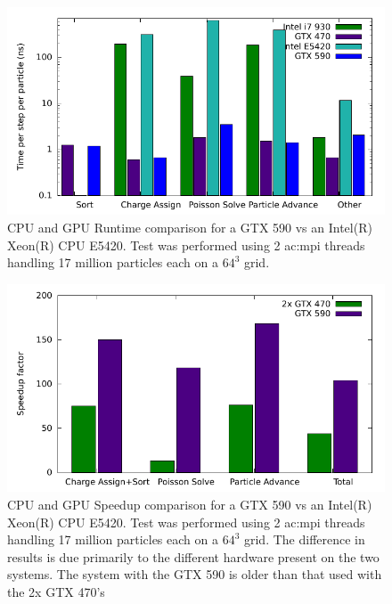 \noindent \begin{figure}
\begin{center}
\includegraphics[width=6in]{performance/architecture_compare.pdf}
\end{center}
\caption[CPU and GPU Runtime comparison]{CPU and GPU Runtime comparison for a GTX 590 vs an Intel(R) Xeon(R) CPU E5420. Test was performed using 2 \gls{ac:mpi} threads handling 17 million particles each on a $64^3$ grid.}
\label{fig:speedup} 
\end{figure} 

\noindent \begin{figure}
\begin{center}
\includegraphics[width=6in]{performance/architecture_speedup_compare.pdf}
\end{center}
\caption[CPU and GPU Speedup comparison]{CPU and GPU Speedup comparison for a GTX 590 vs an Intel(R) Xeon(R) CPU E5420. Test was performed using 2 \gls{ac:mpi} threads handling 17 million particles each on a $64^3$ grid. The difference in results is due primarily to the different hardware present on the two systems. The system with the GTX 590 is older than that used with the 2x GTX 470's}
\label{fig:speedup2} 
\end{figure} 



